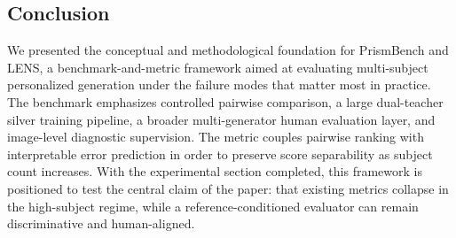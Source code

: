 \subsection{Conclusion}
We presented the conceptual and methodological foundation for PrismBench and LENS, a benchmark-and-metric framework aimed at evaluating multi-subject personalized generation under the failure modes that matter most in practice. The benchmark emphasizes controlled pairwise comparison, a large dual-teacher silver training pipeline, a broader multi-generator human evaluation layer, and image-level diagnostic supervision. The metric couples pairwise ranking with interpretable error prediction in order to preserve score separability as subject count increases. With the experimental section completed, this framework is positioned to test the central claim of the paper: that existing metrics collapse in the high-subject regime, while a reference-conditioned evaluator can remain discriminative and human-aligned.

